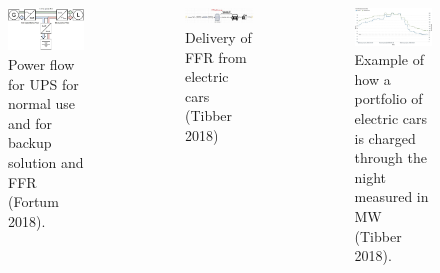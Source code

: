 \documentclass{beamer}
\begin{document}
\begin{frame}
\begin{columns}
\begin{figure}

\includegraphics[scale=0.3]{Figures/fast-frequency-reserves-pilot-2018.jpg}
\caption{\tiny Power flow for UPS for normal use and for backup solution and FFR (Fortum 2018).}
\end{figure}

\begin{figure}
\includegraphics[scale=0.4]{Figures/fast-frequency-reserves-pilot-20181.jpg}
\caption{\tiny Delivery of FFR from electric cars (Tibber 2018)}
\end{figure}
\begin{figure}
\includegraphics[scale=0.4]{Figures/fast-frequency-reserves-pilot-20182.jpg}
\caption{\tiny Example of how a portfolio of electric cars is charged through the night measured in MW (Tibber 2018).}
\end{figure}
\end{columns}
\end{frame}
\end{document}
